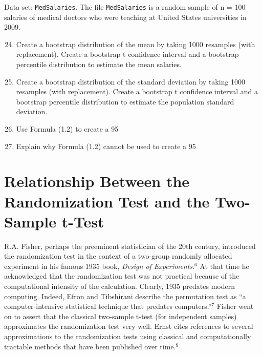 \documentclass[
]{report}
\theoremstyle{definition}
\theoremstyle{definition}
\theoremstyle{definition}
\theoremstyle{definition}
\theoremstyle{remark}
\begin{document}
Data set: \texttt{MedSalaries}.
The file \texttt{MedSalaries} is a random sample of n = 100 salaries of medical doctors who were teaching at United States universities in 2009.

\begin{enumerate}
  \setcounter{enumi}{23} 
  \item Create a bootstrap distribution of the mean by taking 1000 resamples (with replacement). Create a bootstrap t confidence interval and a bootstrap percentile distribution to estimate the mean salaries.
  \item Create a bootstrap distribution of the standard deviation by taking 1000 resamples (with replacement). Create a bootstrap t confidence interval and a bootstrap percentile distribution to estimate the population standard deviation.
  \item Use Formula (1.2) to create a 95%
  \item Explain why Formula (1.2) cannot be used to create a 95%
\end{enumerate}

\hypertarget{relationship-between-the-randomization-test-and-the-two-sample-t-test}{%
\section{\texorpdfstring{\textbf{Relationship Between the Randomization Test and the Two-Sample t-Test}}{Relationship Between the Randomization Test and the Two-Sample t-Test}}\label{relationship-between-the-randomization-test-and-the-two-sample-t-test}}

R.A. Fisher, perhaps the preeminent statistician of the 20th century, introduced the randomization test in the context of a two-group randomly allocated experiment in his famous 1935 book, \emph{Design of Experiments}.\(^6\) At that time he acknowledged that the randomization test was not practical because of the computational
intensity of the calculation. Clearly, 1935 predates modern computing. Indeed, Efron and Tibshirani describe the permutation test as ``a computer-intensive statistical technique that predates computers.''\(^7\) Fisher went on to assert that the classical two-sample t-test (for independent samples) approximates the randomization test very well. Ernst cites references to several approximations to the randomization tests using classical and computationally tractable methods that have been published over time.\(^8\)
\end{document}
